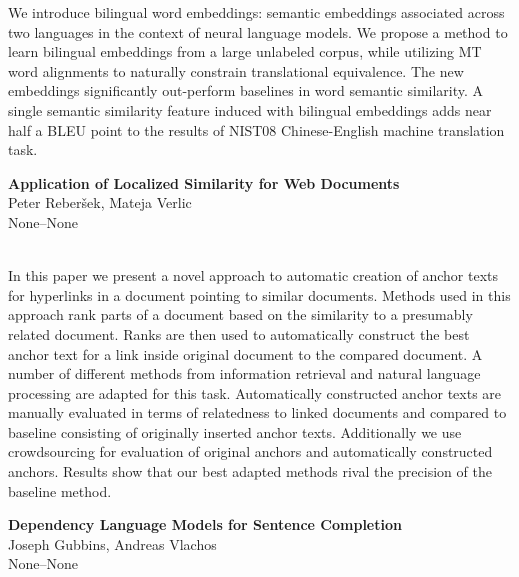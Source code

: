 \documentclass[twoside,makeidx]{book}
\begin{document}
\nopagebreak%
\noindent%
{\small We introduce bilingual word embeddings: semantic embeddings associated across two languages in the context of neural language models. We propose a method to learn bilingual embeddings from a large unlabeled corpus, while utilizing MT word alignments to naturally constrain translational equivalence. The new embeddings significantly out-perform baselines in word semantic similarity. A single semantic similarity feature induced with bilingual embeddings adds near half a BLEU point to the results of NIST08 Chinese-English machine translation task.}
\par\vspace{2em}\noindent%
\begin{minipage}{\linewidth}%
\begin{center}
\textbf{\normalsize Application of Localized Similarity for Web Documents}\\
\normalsize  Peter Reber\v{s}ek,  Mateja Verlic\\
{\small None--None}\\
\end{center}
\end{minipage}\\[0.5em]
\nopagebreak%
\noindent%
{\small In this paper we present a novel approach to automatic creation of anchor texts for hyperlinks in a document pointing to similar documents. Methods used in this approach rank parts of a document based on the similarity to a presumably related document. Ranks are then used to automatically construct the best anchor text for a link inside original document to the compared document. A number of different methods from information retrieval and natural language processing are adapted for this task. Automatically constructed anchor texts are manually evaluated in terms of relatedness to linked documents and compared to baseline consisting of originally inserted anchor texts. Additionally we use crowdsourcing for evaluation of original anchors and automatically constructed anchors. Results show that our best adapted methods rival the precision of the baseline method.}
\par\vspace{2em}\noindent%
\begin{minipage}{\linewidth}%
\begin{center}
\textbf{\normalsize Dependency Language Models for Sentence Completion}\\
\normalsize  Joseph Gubbins,  Andreas Vlachos\\
{\small None--None}\\
\end{center}
\end{minipage}\\[0.5em]
\end{document}
